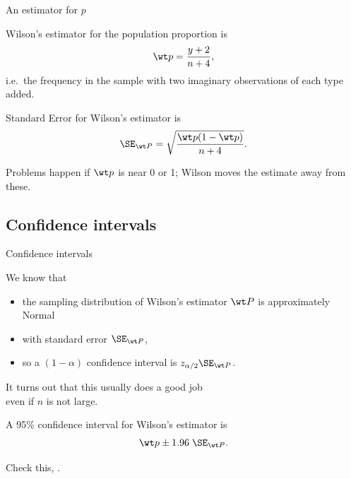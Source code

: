 \begin{frame}{An estimator for $p$}

    \begin{block}{Wilson's estimator}
        for the population proportion is
        \[ \wt p = \frac{ y+2 }{ n+4 } ,\]
        i.e.\ the frequency in the sample with two imaginary observations of each type added.
    \end{block}

    \vspace{2em}


    \begin{block}{Standard Error}
        for Wilson's estimator is
        \[ \SE_{\wt P} = \sqrt{\frac{\wt p (1-\wt p)}{n+4} } .\]
    \end{block}

    \vspace{1em}
     Problems happen if $\wt p$ is near 0 or 1; Wilson moves the estimate away from these.


\end{frame}

\subsection{Confidence intervals}

\begin{frame}{Confidence intervals}

    We know that 
    \begin{itemize}
        \item the sampling distribution of Wilson's estimator $\wt P$ is approximately Normal
        \item with standard error $\SE_{\wt P}$,
        \item so a $(1-\alpha)$ confidence interval is $z_{\alpha/2} \SE_{\wt P}$.
    \end{itemize}
    It turns out that this usually does a good job \\
    \alert{even if $n$ is not large.}

    \vspace{2em}

    \begin{block}{A 95\% confidence interval}
        for Wilson's estimator is
        \[ \wt p \pm 1.96 \; \SE_{\wt P} . \]
    \end{block}

    \vspace{2em}

    Check this, .

\end{frame}


